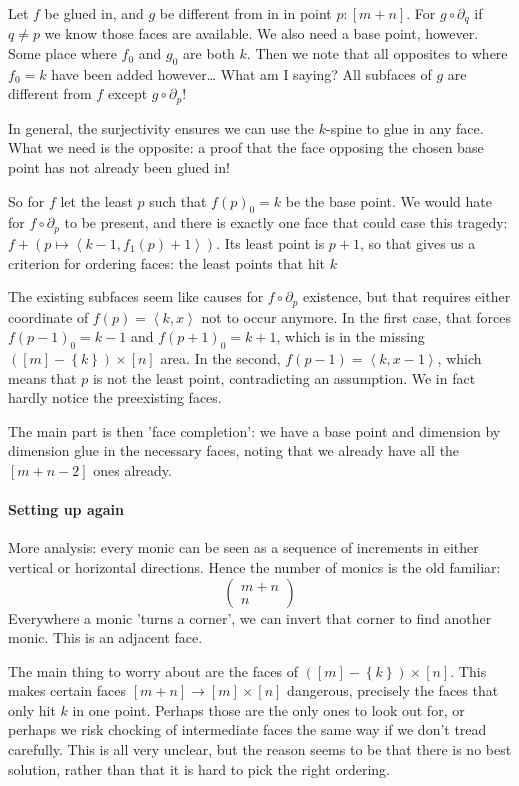 \documentclass{tac}
\newcommand\set[1]{\left\{#1\right\}}
\newcommand\of{:}
\newcommand\tuplet[1]{\left\langle #1 \right\rangle}
\begin{document}
Let $f$ be glued in, and $g$ be different from in in point $p\of[m+n]$. For $g\circ \partial_q$ if $q\neq p$ we know those faces are available.
We also need a base point, however. Some place where $f_0$ and $g_0$ are both $k$.
Then we note that all opposites to where $f_0=k$ have been added however\dots
What am I saying? All subfaces of $g$ are different from $f$ except $g\circ \partial_p$!

In general, the surjectivity ensures we can use the $k$-spine to glue in any face. What we need is the opposite:
a proof that the face opposing the chosen base point has not already been glued in!

So for $f$ let the least $p$ such that $f(p)_0=k$ be the base point. We would hate for $f\circ\partial_p$ to be present, and there is exactly one face that could case this tragedy: $f + (p \mapsto \tuplet{k-1,f_1(p)+1})$. Its least point is $p+1$, so that gives us a criterion for ordering faces: the least points that hit $k$ 

The existing subfaces seem like causes for $f\circ\partial_p$ existence, but that requires either coordinate of $f(p) = \tuplet{k,x}$ not to occur anymore.
In the first case, that forces $f(p-1)_0=k-1$ and $f(p+1)_0=k+1$, which is in the missing $([m]-\set k)\times [n]$ area. In the second, $f(p-1) = \tuplet{k,x-1}$, which means that $p$ is not the least point, contradicting an assumption. We in fact hardly notice the preexisting faces.

The main part is then 'face completion': we have a base point and dimension by dimension glue in the necessary faces, noting that we already have all the $[m+n-2]$ ones already.

\paragraph{Setting up again}
More analysis: every monic can be seen as a sequence of increments in either vertical or horizontal directions. Hence the number of monics is the old familiar:
\[ \left(\begin{array}{c}m+n\\n\end{array}\right) \] 
Everywhere a monic 'turns a corner', we can invert that corner to find another monic. This is an adjacent face. 

The main thing to worry about are the faces of $([m]-\set k)\times [n]$. This makes certain faces $[m+n] \to [m]\times [n]$ dangerous,
precisely the faces that only hit $k$ in one point. Perhaps those are the only ones to look out for, or perhaps we risk chocking of intermediate faces the same way if we don't tread carefully. This is all very unclear, but the reason seems to be that there is no best solution, rather than that it is hard to pick the right ordering.
\end{document}
